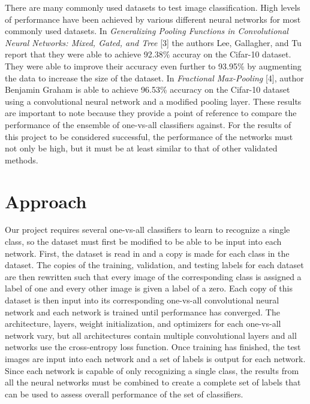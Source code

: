\documentclass[10pt,twocolumn,letterpaper]{article}
\begin{document}
There are many commonly used datasets to test image classification. High levels of performance have been achieved by various different neural networks for most commonly used datasets. In \textit{Generalizing Pooling Functions in Convolutional Neural Networks: Mixed, Gated, and Tree} [3] the authors Lee, Gallagher, and Tu report that they were able to achieve 92.38\% accuray on the Cifar-10 dataset. They were able to improve their accuracy even further to 93.95\% by augmenting the data to increase the size of the dataset. In \textit{Fractional Max-Pooling} [4], author Benjamin Graham is able to achieve 96.53\% accuracy on the Cifar-10 dataset using a convolutional neural network and a modified pooling layer. These results are important to note because they provide a point of reference to compare the performance of the ensemble of one-vs-all classifiers against. For the results of this project to be considered successful, the performance of the networks must not only be high, but it must be at least similar to that of other validated methods.

\section{Approach}
Our project requires several one-vs-all classifiers to learn to recognize a single class, so the dataset must first be modified to be able to be input into each network. First, the dataset is read in and a copy is made for each class in the dataset. The copies of the training, validation, and testing labels for each dataset are then rewritten such that every image of the corresponding class is assigned a label of one and every other image is given a label of a zero. Each copy of this dataset is then input into its corresponding one-vs-all convolutional neural network and each network is trained until performance has converged. The architecture, layers, weight initialization, and optimizers for each one-vs-all network vary, but all architectures contain multiple convolutional layers and all networks use the cross-entropy loss function. Once training has finished, the test images are input into each network and a set of labels is output for each network. Since each network is capable of only recognizing a single class, the results from all the neural networks must be combined to create a complete set of labels that can be used to assess overall performance of the set of classifiers.
\end{document}
